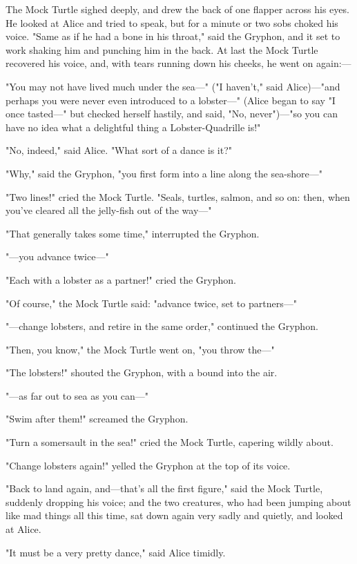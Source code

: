 The Mock Turtle sighed deeply, and drew the back of one flapper across his eyes. He looked at Alice and tried to speak, but for a minute or two sobs choked his voice. "Same as if he had a bone in his throat," said the Gryphon, and it set to work shaking him and punching him in the back. At last the Mock Turtle recovered his voice, and, with tears running down his cheeks, he went on again:—

"You may not have lived much under the sea—" ("I haven't," said Alice)—"and perhaps you were never even introduced to a lobster—" ​(Alice began to say "I once tasted—" but checked herself hastily, and said, "No, never")—"so you can have no idea what a delightful thing a Lobster-Quadrille is!"

"No, indeed," said Alice. "What sort of a dance is it?"

"Why," said the Gryphon, "you first form into a line along the sea-shore—"

"Two lines!" cried the Mock Turtle. "Seals, turtles, salmon, and so on: then, when you've cleared all the jelly-fish out of the way—"

"That generally takes some time," interrupted the Gryphon.

"—you advance twice—"

"Each with a lobster as a partner!" cried the Gryphon.

"Of course," the Mock Turtle said: "advance twice, set to partners—"

"—change lobsters, and retire in the same order," continued the Gryphon.

"Then, you know," the Mock Turtle went on, "you throw the—"

​"The lobsters!" shouted the Gryphon, with a bound into the air.

"—as far out to sea as you can—"

"Swim after them!" screamed the Gryphon.

"Turn a somersault in the sea!" cried the Mock Turtle, capering wildly about.

"Change lobsters again!" yelled the Gryphon at the top of its voice.

"Back to land again, and—that's all the first figure," said the Mock Turtle, suddenly dropping his voice; and the two creatures, who had been jumping about like mad things all this time, sat down again very sadly and quietly, and looked at Alice.

"It must be a very pretty dance," said Alice timidly.

